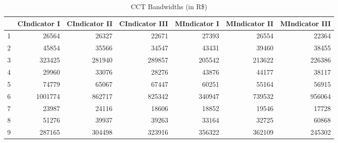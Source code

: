 \begin{table}[!htbp]
\centering
\caption{CCT Bandwidths (in R\$)} 
\label{tab:cctbandwidth}
\begin{tabular}{lrrrrrr}
  \hline
\hline
 & CIndicator I & CIndicator II & CIndicator III & MIndicator I & MIndicator II & MIndicator III \\ 
  \hline
1 & 26564 & 26327 & 22671 & 27393 & 26554 & 22364 \\ 
  2 & 45854 & 35566 & 34547 & 43431 & 39460 & 38455 \\ 
  3 & 323425 & 281940 & 289857 & 205542 & 213622 & 226386 \\ 
   \hline
4 & 29960 & 33076 & 28276 & 43876 & 44177 & 38117 \\ 
  5 & 74779 & 65067 & 67447 & 60251 & 55164 & 56915 \\ 
  6 & 1001774 & 862717 & 825342 & 340947 & 739532 & 956064 \\ 
   \hline
7 & 23987 & 24116 & 18606 & 18852 & 19546 & 17728 \\ 
  8 & 51276 & 39937 & 39263 & 33164 & 32725 & 60868 \\ 
  9 & 287165 & 304498 & 323916 & 356322 & 362109 & 245302 \\ 
   \hline
\hline
\end{tabular}
\end{table}
